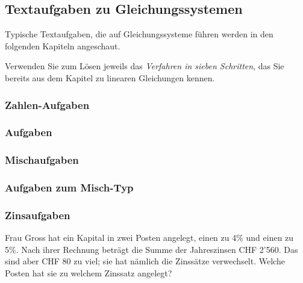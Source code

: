 \GESO{}
\newpage

\TALS{
\newpage}


\newpage

\TALS{
  \newpage}

\TALS{
  \newpage}

\TALS{
\newpage}


\subsection{Textaufgaben zu Gleichungssystemen}
Typische Textaufgaben, die auf Gleichungssysteme führen werden in den folgenden Kapiteln angeschaut.


Verwenden Sie zum Lösen jeweils das \textit{Verfahren in sieben
Schritten}, das Sie bereits aus dem Kapitel zu linearen Gleichungen kennen.

\subsubsection{Zahlen-Aufgaben}
  \subsubsection*{Aufgaben}
  \newpage
  
\subsubsection{Mischaufgaben}


\subsubsection*{Aufgaben zum Misch-Typ}

\newpage


\subsubsection{Zinsaufgaben}

Frau Gross hat ein Kapital in zwei Posten angelegt, einen zu 4\%
und einen zu 5\%. Nach ihrer Rechnung beträgt die Summe der
Jahreszinsen CHF 2’560. Das sind aber CHF 80 zu viel; sie hat
nämlich die Zinssätze verwechselt. Welche Posten hat sie zu welchem
Zinssatz angelegt?

